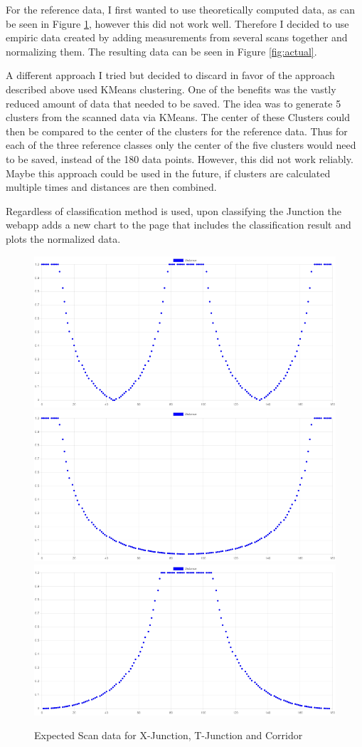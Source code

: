 For the reference data, I first wanted to use theoretically computed data, as can be seen in Figure \ref{fig:theory}, however this did not work well.
Therefore I decided to use empiric data created by adding measurements from several scans together and normalizing them. The resulting data can be seen in Figure \ref{fig:actual}.

A different approach I tried but decided to discard in favor of the approach described above used KMeans clustering.
One of the benefits was the vastly reduced amount of data that needed to be saved.
The idea was to generate 5 clusters from the scanned data via KMeans. The center of these Clusters could then be compared to the center of the clusters for the reference data.
Thus for each of the three reference classes only the center of the five clusters would need to be saved, instead of the 180 data points.
However, this did not work reliably.
Maybe this approach could be used in the future, if clusters are calculated multiple times and distances are then combined.

Regardless of classification method is used, upon classifying the Junction the webapp adds a new chart to the page that includes the classification result and plots the normalized data.

\begin{figure}
    \centering
    \includegraphics[width=0.45\linewidth]{figures/x_graph.png}
    \includegraphics[width=0.45\linewidth]{figures/t_graph.png}
    \includegraphics[width=0.45\linewidth]{figures/c_graph.png}
    \caption{Expected Scan data for X-Junction, T-Junction and Corridor}

    \label{fig:theory}
\end{figure}

